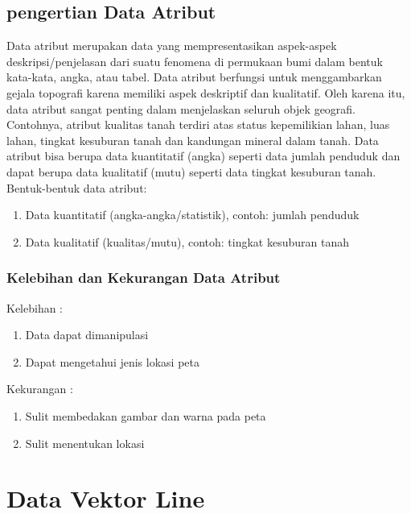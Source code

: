 \subsection{pengertian Data Atribut}
Data atribut merupakan data yang mempresentasikan aspek-aspek deskripsi/penjelasan 
dari suatu fenomena di permukaan bumi dalam bentuk kata-kata, angka, atau tabel. 
Data atribut berfungsi untuk menggambarkan gejala topografi karena memiliki aspek deskriptif dan kualitatif. 
Oleh karena itu, data atribut sangat penting dalam menjelaskan seluruh objek geografi. 
Contohnya, atribut kualitas tanah terdiri atas status kepemilikian lahan, luas lahan, 
tingkat kesuburan tanah dan kandungan mineral dalam tanah. 
Data atribut bisa berupa data kuantitatif (angka) seperti data jumlah penduduk dan dapat berupa data kualitatif (mutu) 
seperti data tingkat kesuburan tanah.  
Bentuk-bentuk data atribut:
\begin{enumerate}
\item	Data kuantitatif (angka-angka/statistik), contoh: jumlah penduduk
\item	Data kualitatif (kualitas/mutu), contoh: tingkat kesuburan tanah
\end{enumerate}

\subsubsection{Kelebihan dan Kekurangan Data Atribut}
Kelebihan :
\begin{enumerate}
   \item Data dapat dimanipulasi 
   \item Dapat mengetahui jenis lokasi peta
\end{enumerate}
Kekurangan :
\begin{enumerate}
   \item Sulit membedakan gambar dan warna pada peta
   \item Sulit menentukan lokasi
\end{enumerate}

\section{Data Vektor Line}
